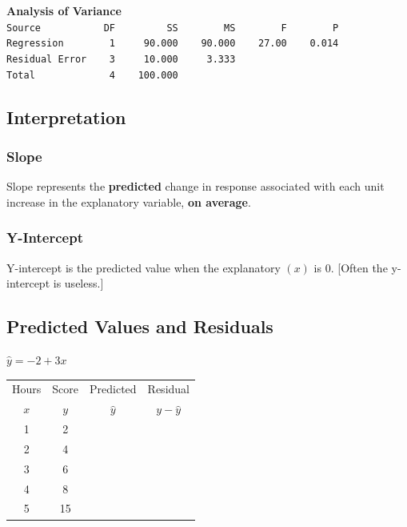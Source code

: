 \documentclass[9pt, oneside]{extarticle}     %
\begin{document}
{\bf Analysis of Variance}\\
\verb|Source           DF         SS        MS        F        P|\\
\verb|Regression        1     90.000    90.000    27.00    0.014|\\
\verb|Residual Error    3     10.000     3.333|\\
\verb|Total             4    100.000|\\

\vspace{3in}
\subsection{Interpretation} %
\label{sub:interpretation}
\subsubsection{Slope}
Slope represents the  \textbf{predicted} change in response associated with each unit increase in the explanatory variable, \textbf{on average}.\\[.25in]
\subsubsection{Y-Intercept}
Y-intercept is the predicted value when the explanatory $(x)$ is 0. [Often the y-intercept is useless.]


\newpage


\subsection{Predicted Values and Residuals}
  $\hat{y}=-2+3x$
  \begin{table}[ht]
  \Huge
  \begin{tabular*}{6cm}[h]{cccc}
  Hours & Score & Predicted & Residual\\
  $x$ & $y$ & $\hat{y}$ & $y-\hat{y}$\\
  1 & 2 & \quad & \\
  2 & 4 & \quad & \\
  3 & 6 & \quad & \\
  4 & 8 & \quad & \\
  5 & 15 & \quad &
  \end{tabular*}
  \end{table}
\end{document}
